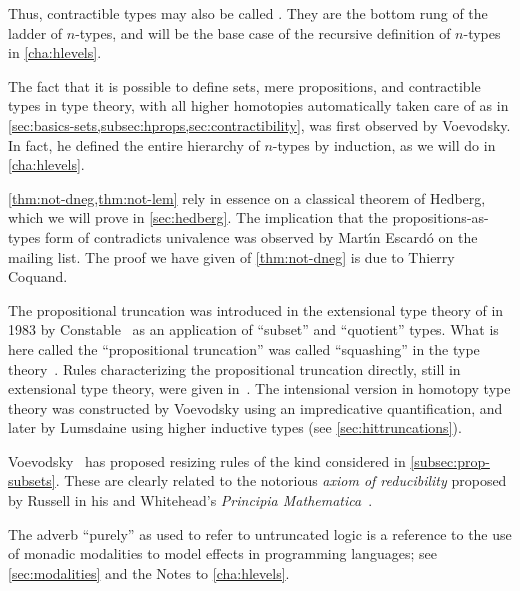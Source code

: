 Thus, contractible types may also be called .
They are the bottom rung of the ladder of $n$-types, and will be the base case of the recursive definition of $n$-types in \autoref{cha:hlevels}.

%
%

\sectionNotes

The fact that it is possible to define sets, mere propositions, and contractible types in type theory, with all higher homotopies automatically taken care of as in \autoref{sec:basics-sets,subsec:hprops,sec:contractibility}, was first observed by Voevodsky.
In fact, he defined the entire hierarchy of $n$-types by induction, as we will do in \autoref{cha:hlevels}.

\autoref{thm:not-dneg,thm:not-lem} rely in essence on a classical theorem of Hedberg,
%
%
which we will prove in \autoref{sec:hedberg}.
The implication that the propositions-as-types form of \LEM{} contradicts univalence was observed by Mart\'\i n Escard\'o on the \Agda mailing list.
The proof we have given of \autoref{thm:not-dneg} is due to Thierry Coquand.

The propositional truncation was introduced in the extensional type theory of
%
\NuPRL in 1983 by Constable~\cite{Con85} as an
application of ``subset'' and ``quotient'' types.  What is here called the
``propositional truncation'' was called ``squashing'' in the \NuPRL type theory~\cite{constable+86nuprl-book}.
Rules characterizing the propositional truncation directly, still in extensional type theory, were given in~\cite{ab:bracket-types}.
The intensional version in homotopy type theory was constructed by Voevodsky using an impredicative quantification, and later by Lumsdaine using higher inductive types (see \autoref{sec:hittruncations}).

%
Voevodsky~\cite{Universe-poly} has proposed resizing rules of the kind considered in \autoref{subsec:prop-subsets}.
%
These are clearly related to the notorious \emph{axiom of reducibility} proposed by Russell in his and Whitehead's \emph{Principia Mathematica}~\cite{WR:PM}.

The adverb ``purely'' as used to refer to untruncated logic is a reference to the use of monadic modalities to model effects in programming languages; see \autoref{sec:modalities} and the Notes to \autoref{cha:hlevels}.

